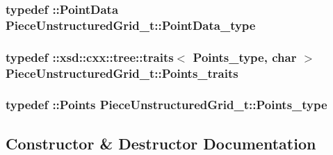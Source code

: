\subsubsection[{\texorpdfstring{Point\+Data\+\_\+type}{PointData_type}}]{\setlength{\rightskip}{0pt plus 5cm}typedef \+::{\bf Point\+Data} {\bf Piece\+Unstructured\+Grid\+\_\+t\+::\+Point\+Data\+\_\+type}}\hypertarget{classPieceUnstructuredGrid__t_a5d79d8ea03ca53f80f24e62c2175ec02}{}\label{classPieceUnstructuredGrid__t_a5d79d8ea03ca53f80f24e62c2175ec02}
\subsubsection[{\texorpdfstring{Points\+\_\+traits}{Points_traits}}]{\setlength{\rightskip}{0pt plus 5cm}typedef \+::xsd\+::cxx\+::tree\+::traits$<$ {\bf Points\+\_\+type}, char $>$ {\bf Piece\+Unstructured\+Grid\+\_\+t\+::\+Points\+\_\+traits}}\hypertarget{classPieceUnstructuredGrid__t_abdfd9c9f9eb5f43bd4cfcb2fad6d9f63}{}\label{classPieceUnstructuredGrid__t_abdfd9c9f9eb5f43bd4cfcb2fad6d9f63}
\subsubsection[{\texorpdfstring{Points\+\_\+type}{Points_type}}]{\setlength{\rightskip}{0pt plus 5cm}typedef \+::{\bf Points} {\bf Piece\+Unstructured\+Grid\+\_\+t\+::\+Points\+\_\+type}}\hypertarget{classPieceUnstructuredGrid__t_a7747b159a3d1eee8d02a0eefaa235711}{}\label{classPieceUnstructuredGrid__t_a7747b159a3d1eee8d02a0eefaa235711}


\subsection{Constructor \& Destructor Documentation}
